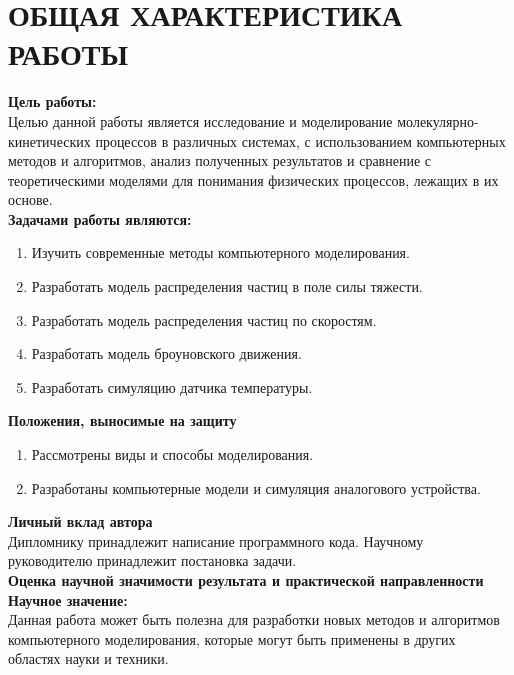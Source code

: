 \chapter*{ОБЩАЯ ХАРАКТЕРИСТИКА РАБОТЫ}
\label{ch:target}

\noindent \textbf{Цель работы:} \\
\indent Целью данной работы является исследование и моделирование молекулярно-кинетических процессов в различных системах, с использованием компьютерных методов и алгоритмов, анализ полученных результатов и сравнение с теоретическими моделями для понимания физических процессов, лежащих в их основе.  \\


\noindent \textbf{Задачами работы являются:}
\begin{enumerate}
    \item Изучить современные методы компьютерного моделирования.
    \item Разработать модель распределения частиц в поле силы тяжести.
    \item Разработать модель распределения частиц по скоростям.
    \item Разработать модель броуновского движения.
    \item Разработать симуляцию датчика температуры.
\end{enumerate}

\noindent \textbf{Положения, выносимые на защиту}
\begin{enumerate}
    \item Рассмотрены виды и способы моделирования.
    \item Разработаны компьютерные модели и симуляция аналогового устройства.   
\end{enumerate}

\noindent \textbf{Личный вклад автора} \\
\indent Дипломнику принадлежит написание программного кода. Научному руководителю принадлежит постановка задачи. \\

\noindent \textbf{Оценка научной значимости результата и практической направленности} \\
\indent \textbf{Научное значение:} \\
\indent Данная работа может быть полезна для разработки новых методов и алгоритмов компьютерного моделирования, которые могут быть применены в других областях науки и техники. \\

